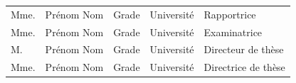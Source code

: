 \begin{center}
\begin{normalsize}
\begin{tabular}{lllll}
    Mme. & Prénom Nom & Grade & Université & Rapportrice \\
    
    Mme. & Prénom Nom & Grade & Université & Examinatrice \\
    
    M. & Prénom Nom & Grade & Université & Directeur de thèse \\
    
    Mme. & Prénom Nom & Grade & Université & Directrice de thèse \\
   
  \end{tabular}   
  \end{normalsize} 
\end{center}

\restoregeometry

\clearpage
\thispagestyle{empty}
\color{black}